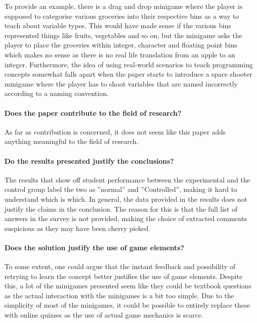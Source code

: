To provide an example, there is a drag and drop minigame where the player is supposed to categorise various groceries into their respective bins as a way to teach about variable types. This would have made sense if the various bins represented things like fruits, vegetables and so on, but the minigame asks the player to place the groceries within integer, character and floating point bins which makes no sense as there is no real life translation from an apple to an integer. 
Furthermore, the idea of using real-world scenarios to teach programming concepts somewhat falls apart when the paper starts to introduce a space shooter minigame where the player has to shoot variables that are named incorrectly according to a naming convention.  

\paragraph{Does the paper contribute to the field of research?}
As far as contribution is concerned, it does not seem like this paper adds anything meaningful to the field of research. 

\paragraph{Do the results presented justify the conclusions?} 
The results that show off student performance between the experimental and the control group label the two as ''normal'' and ''Controlled'', making it hard to understand which is which. In general, the data provided in the results does not justify the claims in the conclusion. The reason for this is that the full list of answers in the survey is not provided, making the choice of extracted comments suspicious as they may have been cherry picked. 

\paragraph{Does the solution justify the use of game elements?}
To some extent, one could argue that the instant feedback and possibility of retrying to learn the concept better justifies the use of game elements. Despite this, a lot of the minigames presented seem like they could be textbook questions as the actual interaction with the minigames is a bit too simple. Due to the simplicity of most of the minigames, it could be possible to entirely replace these with online quizzes as the use of actual game mechanics is scarce. 

